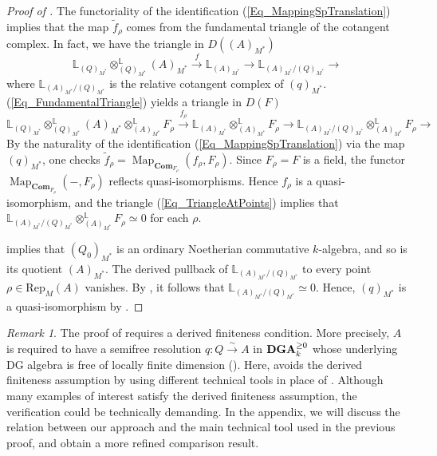 \documentclass{article}
\numberwithin{equation}{section} %
\theoremstyle{plain}
\theoremstyle{definition}
\theoremstyle{remark}
\newtheorem{remark}{Remark}
\begin{document}
\begin{proof}[Proof of ]
The functoriality of the identification (\ref{Eq_MappingSpTranslation}) implies that the map $\tilde{f}_{\rho}$ comes from the fundamental triangle of the cotangent complex.
In fact, we have the triangle in $D((A)_{M^*})$
\begin{equation}\label{Eq_FundamentalTriangle}
\mathbb{L}_{(Q)_{M^*}}\otimes^\mathbb{L}_{(Q)_{M^*}}(A)_{M^*}\xrightarrow{f}\mathbb{L}_{(A)_{M^*}}\to\mathbb{L}_{(A)_{M^*}/(Q)_{M^*}}\to
\end{equation}
where $\mathbb{L}_{(A)_{M^*}/(Q)_{M^*}}$ is the relative cotangent complex of $(q)_{M^*}$.
(\ref{Eq_FundamentalTriangle}) yields a triangle in $D(F)$
\begin{equation}\label{Eq_TriangleAtPoints}
\mathbb{L}_{(Q)_{M^*}}\otimes^\mathbb{L}_{(Q)_{M^*}}(A)_{M^*}\otimes^\mathbb{L}_{(A)_{M^*}}F_\rho\xrightarrow{f_\rho}\mathbb{L}_{(A)_{M^*}}\otimes^\mathbb{L}_{(A)_{M^*}}F_\rho\to\mathbb{L}_{(A)_{M^*}/(Q)_{M^*}}\otimes^\mathbb{L}_{(A)_{M^*}}F_\rho\to
\end{equation}
By the naturality of the identification (\ref{Eq_MappingSpTranslation}) via the map $(q)_{M^*}$, one checks $\tilde{f}_\rho=\operatorname{Map}_{\mathbf{Com}_{F_\rho}}(f_\rho,F_\rho)$.
Since $F_\rho=F$ is a field, the functor $\operatorname{Map}_{\mathbf{Com}_{F_\rho}}(-,F_\rho)$ reflects quasi-isomorphisms.
Hence $f_\rho$ is a quasi-isomorphism, and the triangle (\ref{Eq_TriangleAtPoints}) implies that $\mathbb{L}_{(A)_{M^*}/(Q)_{M^*}}\otimes^\mathbb{L}_{(A)_{M^*}}F_\rho\simeq0$ for each $\rho$.

 implies that $(Q_0)_{M^*}$ is an ordinary Noetherian commutative $k$-algebra, and so is its quotient $(A)_{M^*}$.
The derived pullback of $\mathbb{L}_{(A)_{M^*}/(Q)_{M^*}}$ to every point $\rho\in\mathrm{Rep}_M(A)$ vanishes.
By \cite[Lemma 2.11]{N92}, it follows that $\mathbb{L}_{(A)_{M^*}/(Q)_{M^*}}\simeq0$.
Hence, $(q)_{M^*}$ is a quasi-isomorphism by \cite[Corollary 3.2.17]{Lu04}.
\end{proof}

\begin{remark}
The proof of \cite[Theorem 21]{BFR14} requires a derived finiteness condition.
More precisely, $A$ is required to have a semifree resolution $q:Q\xrightarrow{\sim}A$ in ${\bf DGA}_k^{\geq0}$ whose underlying DG algebra is free of locally finite dimension ().
Here,  avoids the derived finiteness assumption by using different technical tools in place of \cite[Proposition 1.3]{K01}.
Although many examples of interest satisfy the derived finiteness assumption, the verification could be technically demanding.
In the appendix, we will discuss the relation between our approach and the main technical tool \cite[Proposition 1.3]{K01} used in the previous proof, and obtain a more refined comparison result.
\end{remark}
\end{document}
